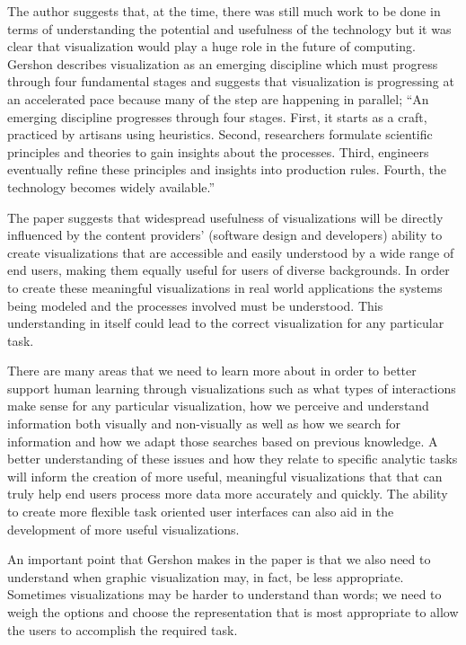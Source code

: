 \documentclass{sig-alternate}
\begin{document}
The author suggests that, at the time, there was still much work to be done in
terms of understanding the potential and usefulness of the technology but it was
clear that visualization would play a huge role in the future of computing.
Gershon describes visualization as an emerging discipline which must progress
through four fundamental stages and suggests that visualization is progressing
at an accelerated pace because many of the step are happening in parallel; ``An
emerging discipline progresses through four stages. First, it starts as a craft,
practiced by artisans using heuristics. Second, researchers formulate scientific
principles and theories to gain insights about the processes. Third, engineers
eventually refine these principles and insights into production rules. Fourth,
the technology becomes widely available.'' \cite{Gershon:1998:Informationvisualization}
 
 
The paper suggests that widespread usefulness of visualizations will be directly
influenced by the content providers' (software design and developers) ability to
create visualizations that are accessible and easily understood by a wide range
of end users, making them equally useful for users of diverse backgrounds. In
order to create these meaningful visualizations in real world applications the
systems being modeled and the processes involved must be understood. This
understanding in itself could lead to the correct visualization for any
particular task.
 
 
There are many areas that we need to learn more about in order to better support
human learning through visualizations such as what types of interactions make
sense for any particular visualization, how we perceive and understand
information both visually and non-visually as well as how we search for
information and how we adapt those searches based on previous knowledge. A
better understanding of these issues and how they relate to specific analytic
tasks will inform the creation of more useful, meaningful visualizations that
that can truly help end users process more data more accurately and quickly. The
ability to create more flexible task oriented user interfaces can also aid in
the development of more useful visualizations.
 
 
An important point that Gershon makes in the paper is that we also need to
understand when graphic visualization may, in fact, be less appropriate.
Sometimes visualizations may be harder to understand than words; we need to
weigh the options and choose the representation that is most appropriate to
allow the users to accomplish the required task.
 
\end{document}
